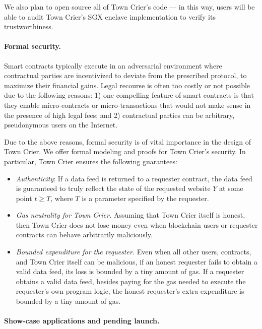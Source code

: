 We also plan to open source all of Town Crier's code --- in this way, 
users will be able to audit Town Crier's SGX enclave implementation
to verify its trustworthiness.


\paragraph{Formal security.}
Smart contracts  typically execute in an adversarial environment
where contractual parties are incentivized to 
deviate from the prescribed protocol, to maximize their financial gains.
Legal recourse is often too costly or 
not possible due to the following reasons:
1) one compelling feature of 
smart contracts is that they enable 
micro-contracts or micro-transactions that 
would not make sense in the presence of high legal fees;
and 2) contractual parties can be arbitrary, pseudonymous users on the Internet.

Due to the above reasons, formal security is of vital importance
in the design of Town Crier.
We offer formal modeling and proofs for Town Crier's security.
In particular, Town Crier ensures  
the following guarantees:

\begin{itemize}[leftmargin=5mm]
\item
{\it Authenticity}: If a data feed is returned
to a requester contract, the data feed is guaranteed
to truly reflect the state of 
the requested website $Y$ 
at some point $t \geq T$, where $T$ is a parameter  specified 
by the requester.
\item
{\it Gas neutrality for Town Crier.} 
Assuming that Town Crier itself is honest, 
then Town Crier does not lose money   
even when blockchain users or requester contracts
can behave arbitrarily maliciously.
\item
{\it Bounded expenditure for the requester.} 
Even when all other users, contracts, and Town Crier itself 
can be malicious, 
if an honest requester  
fails to obtain a valid data feed, its loss is bounded by a tiny 
amount of gas.
If a requester obtains a valid data feed, besides paying for the gas
needed to execute the requester's own program logic, the honest requester's 
extra expenditure  
is bounded by a tiny amount of gas.
\end{itemize}


\paragraph{Show-case applications and pending launch.}







